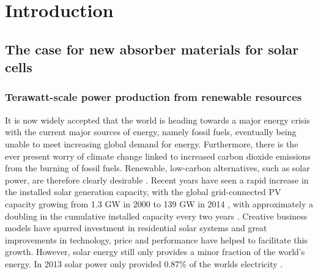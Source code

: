\documentclass[11pt, twoside]{report}
\begin{document}
\chapter{Introduction}
\setcounter{page}{1}

\section{The case for new absorber materials for solar cells}

\subsection{Terawatt-scale power production from renewable resources}

It is now widely accepted that the world is heading towards a major energy crisis with the current major sources of energy, namely fossil fuels, eventually being unable to meet increasing global demand for energy. Furthermore, there is the ever present worry of climate change linked to increased carbon dioxide emissions from the burning of fossil fuels. Renewable, low-carbon alternatives, such as solar power, are therefore clearly desirable \cite{PV_for_climate_change}. 
Recent years have seen a rapid increase in the installed solar generation capacity, with the global grid-connected PV capacity growing from 1.3 GW in 2000 to 139 GW in 2014 \cite{pathways_129}, with approximately a doubling in the cumulative installed capacity every two years \cite{pathways}. Creative business models have spurred investment in residential solar systems \cite{MIT} and great improvements in technology, price and performance have helped to facilitate this growth. However, solar energy still only provides a minor fraction of the world's energy. In 2013 solar power only provided 0.87\% of the worlds electricity \cite{pathways_130}.
\end{document}
